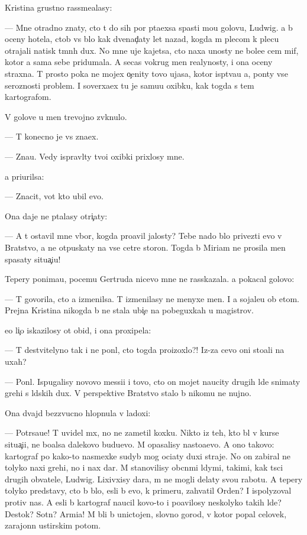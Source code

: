 \documentclass[10pt]{book}
\begin{document}
Kristina grustno rassme{\y}alasy:

— Mne otradno znaty, cto t{\yi} do sih por p{\yi}ta{\y}exsa spasti mo{\y}u golovu, Ludwig. {\Y}a b{\yi} oceny hotela, ctob{\yi} vs{\e} b{\yi}lo kak dvenad{\c}aty let nazad, kogda m{\yi} plecom k plecu otrajali natisk t{\e}mn{\yi}h dux. No mne uje kajetsa, cto naxa {\y}unosty ne bole{\y}e cem mif, kotor{\yi}{\y} {\y}a sama sebe pridumala. A se{\y}cas vokrug men{\ia} realynosty, i ona oceny straxna. T{\yi} prosto poka ne mojex o{\c}enity tovo ujasa, kotor{\yi}{\y} isp{\yi}t{\yi}va{\y}u {\y}a, pon{\ia}ty vse{\y} ser{\y}oznosti problem{\yi}. I soverxa{\y}ex tu je samu{\y}u oxibku, kak togda s tem kartografom.

V golove u men{\ia} trevojno zv{\ia}knulo.

— T{\yi} konecno je vs{\e} zna\-{\y}ex.

— Zna{\y}u. Vedy ispravl{\ia}ty tvo{\y}i oxibki pri\-xlosy mne.

{\Y}a pri{\x}urilsa:

— Znacit, vot kto ubil {\y}evo.

Ona daje ne p{\yi}talasy otri{\c}aty:

— A t{\yi} ostavil mne v{\yi}bor, kogda pro{\y}avil jalosty? Tebe nado b{\yi}lo privezti {\y}evo v Bratstvo, a ne otpuskaty na vse cet{\yi}re storon{\yi}. Togda b{\yi} Mi\-ri\-am ne prosila men{\ia} spasaty situa{\c}i{\y}u!

Tepery ponima{\y}u, pocemu Gertruda nicevo mne ne rasskazala. {\Y}a pokacal go\-lo\-vo{\y}:

— T{\yi} govorila, cto {\y}a izmenilsa. T{\yi} izmenilasy ne menyxe men{\ia}. I {\y}a sojale{\y}u ob etom. Prejn{\ia}{\y}a Kristina nikogda b{\yi} ne stala ubi{\y}{\c}e{\y} na pobeguxkah u magistrov.

{\Y}e{\y}o li{\c}o iskazilosy ot obid{\yi}, i ona proxipela:

— T{\yi} de{\y}stvitelyno tak i ne pon{\ia}l, cto togda proizoxlo?! Iz-za cevo oni sto{\y}ali na uxah?

— Pon{\ia}l. Ispugalisy novovo messi{\y}i i tovo, cto on mojet naucity drugih l{\io}de{\y} snimaty grehi s l{\io}dskih dux. V perspektive Bratstvo stalo b{\yi} nikomu ne nujno.

Ona dvajd{\yi} bezzvucno hlopnula v ladoxi:

— Potr{\ia}sa{\y}u{\x}e! T{\yi} uvidel m{\yi}x, no ne zametil koxku. Nikto iz teh, kto b{\yi}l v kurse situa{\c}i{\y}i, ne bo{\y}alsa dalekovo budu{\x}evo. M{\yi} opasalisy nasto{\y}a{\x}evo. A ono takovo: kartograf po kako{\y}-to nasmexke sudyb{\yi} mog oci{\x}aty duxi straje{\y}. No on zabiral ne tolyko naxi grehi, no i nax dar. M{\yi} stanovilisy ob{\yi}cn{\yi}mi l{\io}dymi, takimi, kak t{\yi}s{\ia}ci drugih ob{\yi}vatele{\y}, Ludwig. Lixivxisy dara, m{\yi} ne mogli delaty svo{\y}u rabotu. A tepery tolyko predstavy, cto b{\yi} b{\yi}lo, {\y}esli b{\yi} {\y}evo, k primeru, zahvatil Orden? I ispolyzoval protiv nas. A {\y}esli b{\yi} kartograf naucil kovo-to i po{\y}avilosy neskolyko takih l{\io}de{\y}? Des{\ia}tok? Sotn{\ia}? Armi{\y}a! M{\yi} b{\yi}li b{\yi} uni\-cto\-jen{\yi}, slovno gorod, v kotor{\yi}{\y} popal celovek, zarajonn{\yi}{\y} {\y}ustirskim potom.
\end{document}
